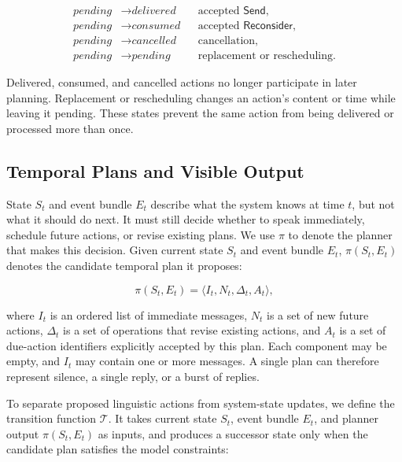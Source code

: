 \documentclass[manuscript,nonacm]{acmart}
\begin{document}
\begin{equation}
\begin{aligned}
\textit{pending} &\rightarrow \textit{delivered} &&\text{accepted }\mathsf{Send},\\
\textit{pending} &\rightarrow \textit{consumed} &&\text{accepted }\mathsf{Reconsider},\\
\textit{pending} &\rightarrow \textit{cancelled} &&\text{cancellation},\\
\textit{pending} &\rightarrow \textit{pending} &&\text{replacement or rescheduling}.
\end{aligned}
\end{equation}

Delivered, consumed, and cancelled actions no longer participate in later
planning. Replacement or rescheduling changes an action's content or time while
leaving it pending. These states prevent the same action from being delivered or
processed more than once.

\subsection{Temporal Plans and Visible Output}

State $S_t$ and event bundle $E_t$ describe what the system knows at time $t$,
but not what it should do next. It must still decide whether to speak
immediately, schedule future actions, or revise existing plans. We use $\pi$ to
denote the planner that makes this decision. Given current state $S_t$ and event
bundle $E_t$,
$\pi(S_t,E_t)$ denotes the candidate temporal plan it proposes:

\begin{equation}
\pi(S_t,E_t)=\langle I_t,N_t,\Delta_t,A_t\rangle,
\end{equation}

where $I_t$ is an ordered list of immediate messages, $N_t$ is a set of new
future actions, $\Delta_t$ is a set of operations that revise existing actions,
and $A_t$ is a set of due-action identifiers explicitly accepted by this plan.
Each component may be empty, and $I_t$ may contain one or more messages. A single
plan can therefore represent silence, a single reply, or a burst of replies.

To separate proposed linguistic actions from system-state updates, we define the
transition function $\mathcal{T}$. It takes current state $S_t$, event bundle
$E_t$, and planner output $\pi(S_t,E_t)$ as inputs, and produces a successor
state only when the candidate plan satisfies the model constraints:
\end{document}
